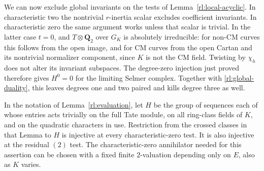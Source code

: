 We can now exclude global invariants on the tests of
Lemma~\ref{rl:local-acyclic}.  In characteristic two the nontrivial
$r$-inertia scalar excludes coefficient invariants.  In characteristic
zero the same argument works unless that scalar is trivial.  In the
latter case $t=0$, and $T\otimes\mathbf Q_2$ over $G_K$ is absolutely
irreducible: for non-CM curves this follows from the open image, and
for CM curves from the open Cartan and its nontrivial normalizer
component, since $K$ is not the CM field.  Twisting by $\chi_h$ does
not alter its invariant subspaces.  The degree-zero injection just
proved therefore gives $H^0=0$ for the limiting Selmer complex.
Together with \eqref{rl:global-duality}, this leaves degrees one and
two paired and kills degree three as well.

\begin{lemma}\label{rl:kernel}
In the notation of Lemma~\ref{rl:evaluation}, let $H$ be the group of
sequences each of whose entries acts trivially on the full Tate module,
on all ring-class fields of $K$, and on the quadratic characters in
use.  Restriction from the crossed classes in that Lemma to $H$ is
injective at every characteristic-zero test.  It is also injective
at the residual $(2)$ test.  The characteristic-zero annihilator
needed for this assertion can be chosen with a fixed finite
$2$-valuation depending only on $E$, also as $K$ varies.
\end{lemma}

